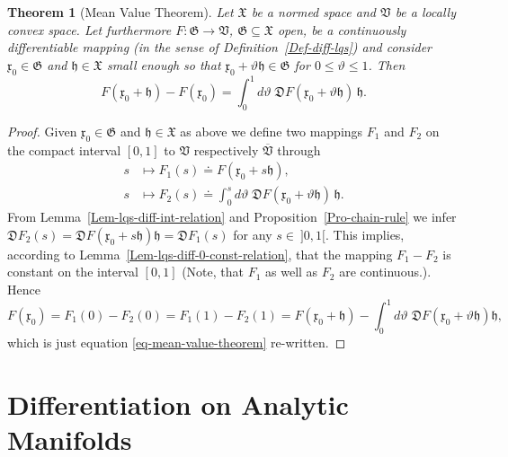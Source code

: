 \documentclass[11pt,twoside,openright]{report}
\theoremstyle{definition}
\theoremstyle{plain}
\newtheorem{The}[Def]{Theorem}
\theoremstyle{remark}
\theoremstyle{assumption}
\newcommand{\Dfrak}{\mathfrak{D}}
\newcommand{\Gfrak}{\mathfrak{G}}
\newcommand{\Vfrak}{\mathfrak{V}}
\newcommand{\Xfrak}{\mathfrak{X}}
\newcommand{\hfrak}{\mathfrak{h}}
\newcommand{\xfrak}{\mathfrak{x}}
\newcommand{\Vfrakbar}{\overline{\mathfrak{V}}}
\begin{document}
\begin{The}[Mean Value Theorem]
  \label{The-mean-value}
  Let $\Xfrak$ be a normed space and $\Vfrak$ be a locally convex
  space. Let furthermore $F : \Gfrak \rightarrow \Vfrak$, $\Gfrak
  \subseteq \Xfrak$ open, be a continuously differentiable mapping (in
  the sense of Definition~\ref{Def-diff-lqs}) and consider $\xfrak_0
  \in \Gfrak$ and $\hfrak \in \Xfrak$ small enough so that $\xfrak_0 +
  \vartheta \hfrak \in \Gfrak$ for $0 \leqslant \vartheta \leqslant
  1$. Then
  \begin{equation}
    \label{eq-mean-value-theorem}
    F ( \xfrak_0 + \hfrak ) - F ( \xfrak_0 ) = \int_0^1 d \vartheta \;
    \Dfrak F ( \xfrak_0 + \vartheta \hfrak ) \, \hfrak \text{.}
  \end{equation}
\end{The}
\begin{proof}
  Given $\xfrak_0 \in \Gfrak$ and $\hfrak \in \Xfrak$ as above we
  define two mappings $F_1$ and $F_2$ on the compact interval $[ 0 , 1
  ]$ to $\Vfrak$ respectively $\Vfrakbar$ through
  \begin{subequations}
    \label{eq-mean-value-def}
    \begin{align}
      s & \mapsto F_1 ( s ) \doteq F ( \xfrak_0 + s \hfrak ) \text{,}
      \\ 
      s & \mapsto F_2 ( s ) \doteq \int_0^s d \vartheta \; \Dfrak F (
      \xfrak_0 + \vartheta \hfrak ) \, \hfrak \text{.}
    \end{align}
  \end{subequations}
  From Lemma~\ref{Lem-lqs-diff-int-relation} and
  Proposition~\ref{Pro-chain-rule} we infer $\Dfrak F_2 ( s ) = \Dfrak
  F ( \xfrak_0 + s \hfrak ) \hfrak = \Dfrak F_1 ( s )$ for any $s \in
  \: ] 0 , 1 [$. This implies, according to
  Lemma~\ref{Lem-lqs-diff-0-const-relation}, that the mapping $F_1 -
  F_2$ is constant on the interval $[ 0 , 1 ]$ (Note, that $F_1$ as
  well as $F_2$ are continuous.). Hence
  \begin{equation*}
    F ( \xfrak_0 ) = F_1 ( 0 ) - F_2 ( 0 ) = F_1 ( 1 ) - F_2 ( 1 ) = F
    ( \xfrak_0 + \hfrak ) - \int_0^1 d \vartheta \; \Dfrak F (
    \xfrak_0 + \vartheta \hfrak ) \hfrak \text{,}
  \end{equation*}
  which is just equation \eqref{eq-mean-value-theorem} re-written.
\end{proof}


\section{Differentiation on Analytic Manifolds}
\end{document}
